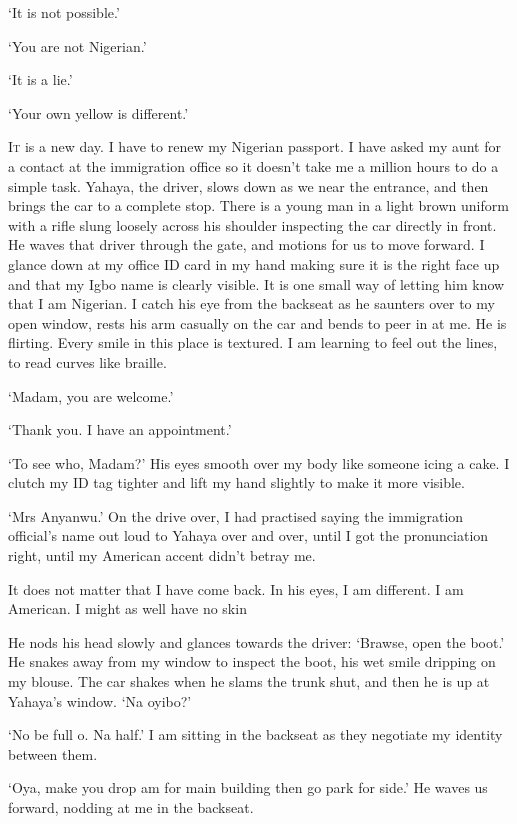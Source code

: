 \documentclass[../main.tex]{subfiles}
\begin{document}
\begin{multicols}{2}
‘It is not possible.’ 

‘You are not Nigerian.’ 

‘It is a lie.’ 

‘Your own yellow is different.’ 

\lettrine{I}{t} is a new day. I have to renew my Nigerian passport. I have asked my aunt for a contact at the immigration office so it doesn’t take me a million hours to do a simple task. Yahaya, the driver, slows down as we near the entrance, and then brings the car to a complete stop. There is a young man in a light brown uniform with a rifle slung loosely across his shoulder inspecting the car directly in front. He waves that driver through the gate, and motions for us to move forward. I glance down at my office ID card in my hand making sure it is the right face up and that my Igbo name is clearly visible. It is one small way of letting him know that I am Nigerian. I catch his eye from the backseat as he saunters over to my open window, rests his arm casually on the car and bends to peer in at me. He is flirting. Every smile in this place is textured. I am learning to feel out the lines, to read curves like braille. 

‘Madam, you are welcome.’ 

‘Thank you. I have an appointment.’ 

‘To see who, Madam?’ His eyes smooth over my body like someone icing a cake. I clutch my ID tag tighter and lift my hand slightly to make it more visible. 

‘Mrs Anyanwu.’ On the drive over, I had practised saying the immigration official’s name out loud to Yahaya over and over, until I got the pronunciation right, until my American accent didn’t betray me. 

\begin{pullquote}
 It does not matter that I have come back. In his eyes, I am different. I am American. I might as well have no skin 
\end{pullquote}

He nods his head slowly and glances towards the driver: ‘Brawse, open the boot.’ He snakes away from my window to inspect the boot, his wet smile dripping on my blouse. The car shakes when he slams the trunk shut, and then he is up at Yahaya’s window. ‘Na oyibo?’ 

‘No be full o. Na half.’ I am sitting in the backseat as they negotiate my identity between them. 

‘Oya, make you drop am for main building then go park for side.’ He waves us forward, nodding at me in the backseat. 


\end{multicols}
\end{document}
